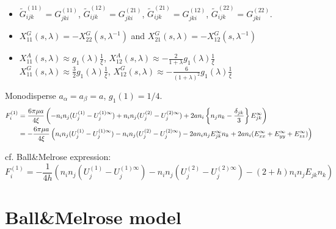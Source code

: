 \documentclass[12pt]{article}
\begin{document}
\begin{itemize}
 \item $\tilde{G}_{ijk}^{(11)}=G_{jki}^{(11)}$,
$\tilde{G}_{ijk}^{(12)}=G_{jki}^{(21)}$,
$\tilde{G}_{ijk}^{(21)}=G_{jki}^{(12)}$,
$\tilde{G}_{ijk}^{(22)}=G_{jki}^{(22)}$.

 \item 
$X_{11}^{G}(s,\lambda)
= - X_{22}^{G} (s, \lambda^{-1})$
and $X_{21}^{G}(s,\lambda)
= - X_{12}^{G} (s, \lambda^{-1})$

 \item 
$X_{11}^{A}(s,\lambda)\approx g_1(\lambda) \frac{1}{\xi}$, 
$X_{12}^{A}(s,\lambda) \approx -\frac{2}{1+\lambda}g_1(\lambda) \frac{1}{\xi}$\\
$X_{11}^{G}(s,\lambda)\approx \frac{3}{2} g_1(\lambda) \frac{1}{\xi}$,
$X_{12}^{G}(s,\lambda)\approx -\frac{6}{(1+\lambda)^2} g_1(\lambda) \frac{1}{\xi}$   
\end{itemize}
Monodisperse $a_\alpha = a_{\beta}=a$, $g_1(1)=1/4$.
\begin{align}
 F^{(1)}_i
&= 
\frac{6 \pi\mu a}{4\xi}
\left(
-   n_i n_j
(U_{j}^{(1)}-U_{j}^{(1)\infty})
+   n_i n_j
(U_{j}^{(2)}-U_{j}^{(2)\infty})
+  
2a n_i\left\{n_j n_k - \frac{\delta_{jk}}{3} \right\} E^{\infty}_{jk}
\right) \notag \\
&= 
-
\frac{6 \pi\mu a}{4\xi}
\left(
   n_i n_j
(U_{j}^{(1)}-U_{j}^{(1)\infty})
-   n_i n_j
(U_{j}^{(2)}-U_{j}^{(2)\infty})
-  
2a n_in_j  E^{\infty}_{jk}n_k
+2an_i(E^{\infty}_{xx}+E^{\infty}_{yy}+E^{\infty}_{zz} )
\right)
\end{align}

cf. Ball\&Melrose expression:
\begin{equation}
F_i^{(1)}
=
- \frac{1}{4 h}
\left(
n_{i} n_j (U^{(1)}_j-U^{(1)\infty}_j)
- n_{i} n_j (U^{(2)}_j-U^{(2)\infty}_j)
- (2+h) n_i n_j  E_{jk}n_k
\right) 
 \end{equation}





\newpage

\section{Ball\&Melrose model}
\end{document}
